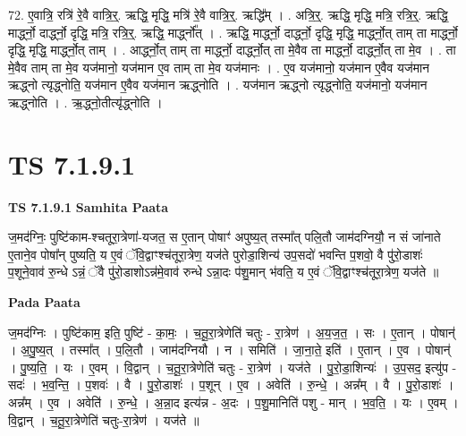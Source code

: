 \documentclass[17pt]{extarticle}
\begin{document}
72. ए॒वात्रि॒ रत्रि॑ रे॒वै वात्रि॒र्॒. ऋद्धि॒ मृद्धि॒ मत्रि॑ रे॒वै वात्रि॒र्॒. ऋद्धि᳚म् । . अत्रि॒र्॒. ऋद्धि॒ मृद्धि॒ मत्रि॒ रत्रि॒र्॒. ऋद्धि॒ मार्द्ध्नो॒ दार्द्ध्नो॒ दृद्धि॒ मत्रि॒ रत्रि॒र्॒. ऋद्धि॒ मार्द्ध्नो᳚त् । . ऋद्धि॒ मार्द्ध्नो॒ दार्द्ध्नो॒ दृद्धि॒ मृद्धि॒ मार्द्ध्नो॒त् ताम् ता मार्द्ध्नो॒ दृद्धि॒ मृद्धि॒ मार्द्ध्नो॒त् ताम् । . आर्द्ध्नो॒त् ताम् ता मार्द्ध्नो॒ दार्द्ध्नो॒त् ता मे॒वैव ता मार्द्ध्नो॒ दार्द्ध्नो॒त् ता मे॒व । . ता मे॒वैव ताम् ता मे॒व यज॑मानो॒ यज॑मान ए॒व ताम् ता मे॒व यज॑मानः । . ए॒व यज॑मानो॒ यज॑मान ए॒वैव यज॑मान ऋद्ध्नो त्यृद्ध्नोति॒ यज॑मान ए॒वैव यज॑मान ऋद्ध्नोति । . यज॑मान ऋद्ध्नो त्यृद्ध्नोति॒ यज॑मानो॒ यज॑मान ऋद्ध्नोति । . ऋ॒द्ध्नो॒तीत्यृ॑द्ध्नोति । \newline
\pagebreak
{}

\section{ TS 7.1.9.1 }

\textbf{TS 7.1.9.1 } \newline
\textbf{Samhita Paata} \newline

ज॒मद॑ग्निः॒ पुष्टि॑काम-श्चतूरा॒त्रेणा॑-यजत॒ स ए॒तान् पोषाꣳ॑ अपुष्य॒त् तस्मा᳚त् पलि॒तौ जाम॑दग्नियौ॒ न सं जा॑नाते ए॒ताने॒व पोषा᳚न् पुष्यति॒ य ए॒वं ॅवि॒द्वाꣳश्च॑तूरा॒त्रेण॒ यज॑ते पुरोडा॒शिन्य॑ उप॒सदो॑ भवन्ति प॒शवो॒ वै पु॑रो॒डाशः॑ प॒शूने॒वाव॑ रु॒न्धे ऽन्नं॒ ॅवै पु॑रो॒डाशोऽन्न॑मे॒वाव॑ रुन्धे ऽन्ना॒दः प॑शु॒मान् भ॑वति॒ य ए॒वं ॅवि॒द्वाꣳश्च॑तूरा॒त्रेण॒ यज॑ते ॥ \newline

\textbf{Pada Paata} \newline

ज॒मद॑ग्निः । पुष्टि॑काम॒ इति॒ पुष्टि॑ - का॒मः॒ । च॒तू॒रा॒त्रेणेति॑ चतुः - रा॒त्रेण॑ । अ॒य॒ज॒त॒ । सः । ए॒तान् । पोषान्॑ । अ॒पु॒ष्य॒त् । तस्मा᳚त् । प॒लि॒तौ । जाम॑दग्नियौ । न । समिति॑ । जा॒ना॒ते॒ इति॑ । ए॒तान् । ए॒व । पोषान्॑ । पु॒ष्य॒ति॒ । यः । ए॒वम् । वि॒द्वान् । च॒तू॒रा॒त्रेणेति॑ चतुः - रा॒त्रेण॑ । यज॑ते । पु॒रो॒डा॒शिन्यः॑ । उ॒प॒सद॒ इत्यु॑प - सदः॑ । भ॒व॒न्ति॒ । प॒शवः॑ । वै । पु॒रो॒डाशः॑ । प॒शून् । ए॒व । अवेति॑ । रु॒न्धे॒ । अन्न᳚म् । वै । पु॒रो॒डाशः॑ । अन्न᳚म् । ए॒व । अवेति॑ । रु॒न्धे॒ । अ॒न्ना॒द इत्य॑न्न - अ॒दः । प॒शु॒मानिति॑ पशु - मान् । भ॒व॒ति॒ । यः । ए॒वम् । वि॒द्वान् । च॒तू॒रा॒त्रेणेति॑ चतुः-रा॒त्रेण॑ । यज॑ते ॥  \newline
\end{document}
